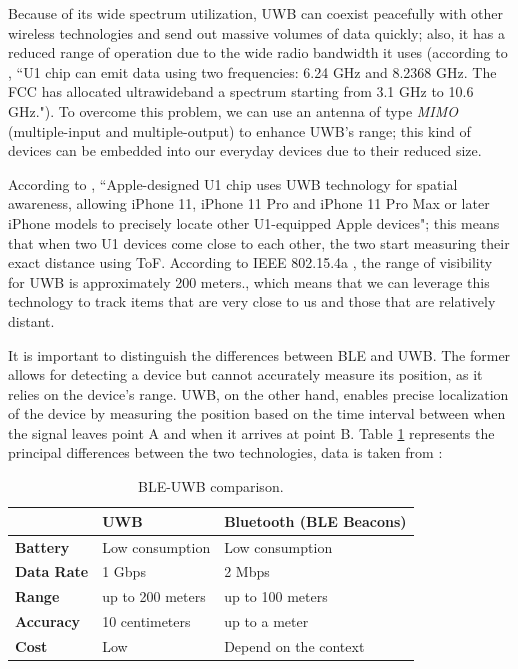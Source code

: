 \documentclass[english]{article}
\begin{document}
Because of its wide spectrum utilization, UWB can coexist peacefully with other wireless technologies and send out massive volumes of data quickly; also, it has a reduced range of operation due to the wide radio bandwidth it uses (according to \cite{Zafar2019}, ``U1 chip can emit data using two frequencies: 6.24 GHz and 8.2368 GHz. The FCC has allocated ultrawideband a spectrum starting from 3.1 GHz to 10.6 GHz."). To overcome this problem, we can use an antenna of type \textit{MIMO} (multiple-input and multiple-output) to enhance UWB's range; this kind of devices can be embedded into our everyday devices due to their reduced size.

According to \cite{aps}, ``Apple-designed U1 chip uses UWB technology for spatial awareness, allowing iPhone 11, iPhone 11 Pro and iPhone 11 Pro Max or later iPhone models to precisely locate other U1-equipped Apple devices"; this means that when two U1 devices come close to each other, the two start measuring their exact distance using ToF. According to IEEE 802.15.4a \cite{5394030}, the range of visibility for UWB is approximately 200 meters., which means that we can leverage this technology to track items that are very close to us and those that are relatively distant.

It is important to distinguish the differences between BLE and UWB. The former allows for detecting a device but cannot accurately measure its position, as it relies on the device's range. UWB, on the other hand, enables precise localization of the device by measuring the position based on the time interval between when the signal leaves point A and when it arrives at point B.
Table \ref{tableu} represents the principal differences between the two technologies, data is taken from \cite{encstore}:
\begin{table}[h] 
\caption{BLE-UWB comparison.}
  \centering
  
    \begin{tabular}{l|l|l|}
      \cline{2-3}
      {}                               & {\textbf{UWB}}                & { \textbf{Bluetooth (BLE Beacons)}} \\ \hline
      \multicolumn{1}{|l|}{{  \textbf{Battery}}}  & {  Low consumption}             & {  Low consumption}                  \\ \hline
      \multicolumn{1}{|l|}{{  \textbf{Data Rate}}}  & { 1 Gbps }             & { 2 Mbps }                  \\ \hline
      \multicolumn{1}{|l|}{{  \textbf{Range}}}    & {  up to 200 meters} & {  up to 100 meters}       \\ \hline
      \multicolumn{1}{|l|}{{  \textbf{Accuracy}}} & {  10 centimeters} & {  up to a meter}                    \\ \hline
      \multicolumn{1}{|l|}{{  \textbf{Cost}}}     & {  Low}                         & {Depend on the context }                              \\ \hline
    \end{tabular}
    \label{tableu}
  \end{table}
\end{document}
